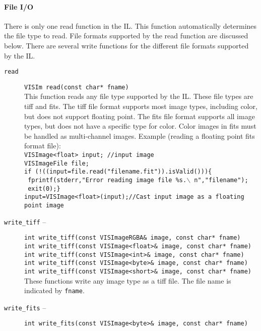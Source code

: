 \paragraph{File I/O}
There is only one read function in the IL.  This function 
automatically determines the file type to read.  File formats 
supported by the read function are discussed below.  There are several 
write functions for the different file formats supported by the IL.
\begin{description}
\item[{\tt read}]
{\tt VISIm read(const char* fname)}\\
This function reads any file type supported by the IL.
These file types are tiff and fits.
The tiff file format supports most image types, including color, but does not 
support floating point.
The fits file format supports all image types, but does not have a 
specific type for color.   Color images in fits must 
be handled as multi-channel images.
Example (reading a floating point fits format file):\\
{\tt VISImage<float> input; //input image}\\
{\tt VISImageFile file;}\\
{\tt if (!((input=file.read("filename.fit")).isValid()))\{}\\
{\tt \hspace*{0.25in} fprintf(stderr,"Error reading image file \%s.$\backslash$ n","filename");}\\
{\tt \hspace*{0.25in} exit(0);\}}\\
{\tt input=VISImage<float>(input);//Cast input image as a floating point image}
\item[{\tt write\_tiff} --]
{\tt int write\_tiff(const VISImageRGBA\& image, const char* fname)}\\
{\tt int write\_tiff(const VISImage<float>\& image, const char* fname)}\\
{\tt int write\_tiff(const VISImage<int>\& image, const char* fname)}\\
{\tt int write\_tiff(const VISImage<byte>\& image, const char* fname)}\\
{\tt int write\_tiff(const VISImage<short>\& image, const char* fname)}\\
These functions write any image type as a tiff file.
The file name is indicated by {\tt fname}.
\item[{\tt write\_fits} --]
{\tt int write\_fits(const VISImage<byte>\& image, const char* fname)}\\

\end{description}
